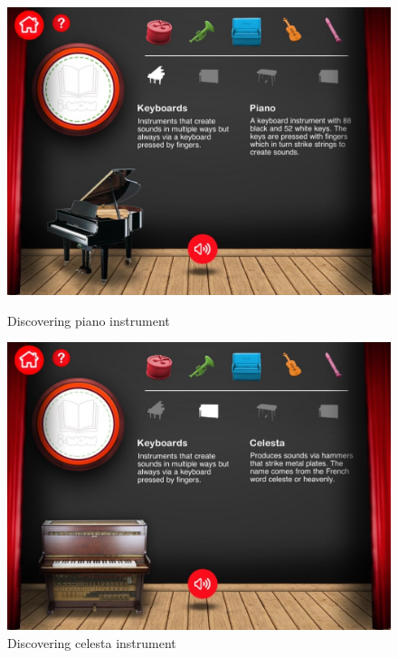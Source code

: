 \begin{figure}[ht!]
  \centering
  \includegraphics[width=350pt]{graphics/additional-screens/discovering_key_piano_screen.jpg}
  \vspace{0.05cm}
  \caption{Discovering piano instrument}
  \vspace{0.6cm}

  \includegraphics[width=350pt]{graphics/additional-screens/discovering_key_celesta_screen.jpg}
  \vspace{0.05cm}
  \caption{Discovering celesta instrument}
\end{figure}

